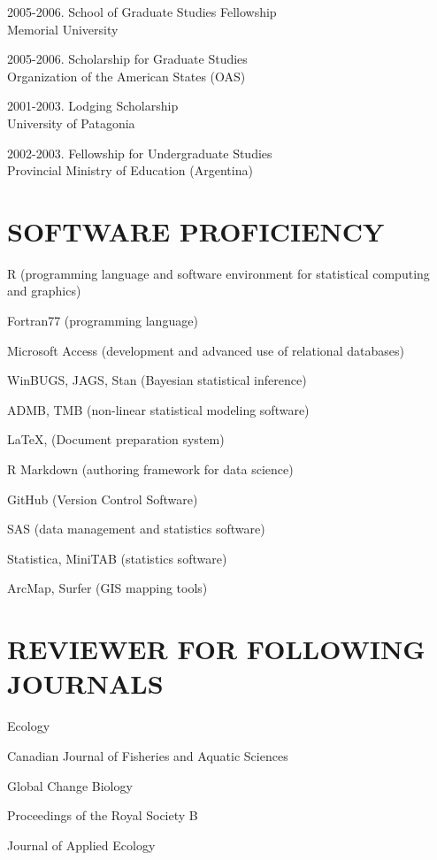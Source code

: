 \documentclass{res}
\begin{document}
\begin{resume}
\begin{hangparas}{.4in}{1}
2005-2006. School of Graduate Studies Fellowship\\
Memorial University

2005-2006. Scholarship for Graduate Studies\\
Organization of the American States (OAS)

2001-2003. Lodging Scholarship\\
University of Patagonia

2002-2003. Fellowship for Undergraduate Studies\\
Provincial Ministry of Education (Argentina)
\end{hangparas}

\pagebreak
\section{SOFTWARE PROFICIENCY}
\vspace{0.2in} 

R (programming language and software environment for statistical computing and graphics)

Fortran77 (programming language)

Microsoft Access (development and advanced use of relational databases)

WinBUGS, JAGS, Stan (Bayesian statistical inference)

ADMB, TMB (non-linear statistical modeling software)

\LaTeX,  (Document preparation system)

R Markdown (authoring framework for data science)

GitHub (Version Control Software)

SAS (data management and statistics software)

Statistica, MiniTAB (statistics software)

ArcMap, Surfer (GIS mapping tools)



\section{REVIEWER FOR FOLLOWING JOURNALS}
\vspace{0.2in}
Ecology

Canadian Journal of Fisheries and Aquatic Sciences

Global Change Biology

Proceedings of the Royal Society B

Journal of Applied Ecology


\end{resume}
\end{document}
